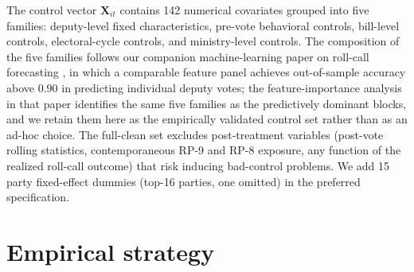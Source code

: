 \documentclass[preprint,12pt,authoryear]{elsarticle}
\begin{document}
The control vector $\mathbf{X}_{it}$ contains 142 numerical covariates grouped into five families: deputy-level fixed characteristics, pre-vote behavioral controls, bill-level controls, electoral-cycle controls, and ministry-level controls. The composition of the five families follows our companion machine-learning paper on roll-call forecasting \citep{CampeloCajueiro2025}, in which a comparable feature panel achieves out-of-sample accuracy above $0.90$ in predicting individual deputy votes; the feature-importance analysis in that paper identifies the same five families as the predictively dominant blocks, and we retain them here as the empirically validated control set rather than as an ad-hoc choice. The full-clean set excludes post-treatment variables (post-vote rolling statistics, contemporaneous RP-9 and RP-8 exposure, any function of the realized roll-call outcome) that risk inducing bad-control problems. We add 15 party fixed-effect dummies (top-16 parties, one omitted) in the preferred specification.

\section{Empirical strategy}
\label{sec:strategy}
\end{document}
